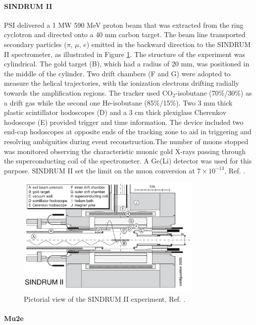 \paragraph{SINDRUM II}
PSI delivered a 1 MW 590 MeV proton beam that was extracted from the ring
cyclotron and directed onto a 40 mm carbon target. The beam line
transported secondary particles ($\pi$, $\mu$, $e$) emitted in the backward direction to the SINDRUM II spectrometer, as
illustrated in Figure \ref{fig:sindrumii}. The structure of the experiment
was cylindrical. The gold target (B), which had a radius of 20 mm, was positioned
in the middle of the cylinder. Two drift chambers (F and G) were adopted to measure
the helical trajectories, with the ionization electrons drifting radially towards the amplification 
regions. The tracker used CO$_2$-isobutane (70\%/30\%) as a drift
gas while the second one He-isobutane (85\%/15\%). Two 3 mm thick plastic scintillator hodoscopes (D) and a 3 cm 
thick plexiglass Cherenkov hodoscope (E) provided trigger and time information. 
The device included two end-cap hodoscopes at opposite ends of the tracking zone to aid in triggering 
and resolving ambiguities during event reconstruction.The number of muons stopped
was monitored observing the characteristic muonic gold X-rays passing through the
superconducting coil of the spectrometer. A Ge(Li) detector was used for this purpose.
SINDRUM II set the limit on the muon conversion at $7 \times 10^{-13}$, Ref. \cite{SINDRUMII:2006dvw}.
\begin{figure}[!h]
\centering
\includegraphics[width =0.8\textwidth]{figures/png/Screenshot_20240307_163120.png}
\caption{Pictorial view of the SINDRUM II experiment, Ref. \cite{SINDRUMII:2006dvw}.}
\label{fig:sindrumii}
\end{figure}
\paragraph{Mu2e}

